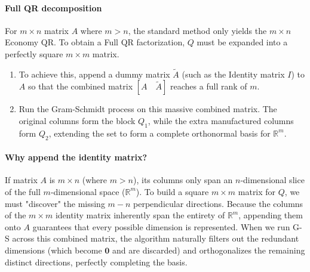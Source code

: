 \documentclass[../linear-algebra.tex]{subfiles}
\begin{document}
\paragraph{Full QR decomposition} For $m \times n$ matrix $A$ where $m > n$, the standard method only yields the $m \times n$ Economy QR.
To obtain a Full QR factorization, $Q$ must be expanded into a perfectly square $m \times m$ matrix.
\begin{enumerate}
    \item To achieve this, append a dummy matrix $\tilde{A}$ (such as the Identity matrix $I$) to $A$ so that the combined matrix $[A \quad \tilde{A}]$ reaches a full rank of $m$.
    \item Run the Gram-Schmidt process on this massive combined matrix. The original columns form the block $Q_1$, while the extra manufactured columns form $Q_2$, extending the set to form a complete orthonormal basis for $\mathbb{R}^m$.
\end{enumerate}
\paragraph{Why append the identity matrix?} If matrix $A$ is $m \times n$ (where $m > n$), its columns only span an $n$-dimensional slice of the full $m$-dimensional space ($\mathbb{R}^m$). To build a square $m \times m$ matrix for $Q$, we must "discover" the missing $m-n$ perpendicular directions.
Because the columns of the $m \times m$ identity matrix inherently span the entirety of $\mathbb{R}^m$, appending them onto $A$ guarantees that every possible dimension is represented. When we run G-S across this combined matrix, the algorithm naturally filters out the redundant dimensions (which become $\mathbf{0}$ and are discarded) and orthogonalizes the remaining distinct directions, perfectly completing the basis.
\end{document}
